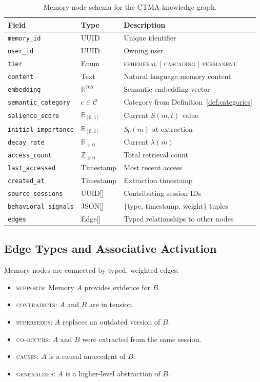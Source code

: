 \documentclass[11pt,a4paper]{article}
\begin{document}
\begin{table}[H]
\centering
\caption{Memory node schema for the CTMA knowledge graph.}
\label{tab:schema}
\small
\begin{tabularx}{\textwidth}{llX}
\toprule
\textbf{Field} & \textbf{Type} & \textbf{Description} \\
\midrule
\texttt{memory\_id} & UUID & Unique identifier \\
\texttt{user\_id} & UUID & Owning user \\
\texttt{tier} & Enum & \textsc{ephemeral} $|$ \textsc{cascading} $|$ \textsc{permanent} \\
\texttt{content} & Text & Natural language memory content \\
\texttt{embedding} & $\mathbb{R}^{768}$ & Semantic embedding vector \\
\texttt{semantic\_category} & $c \in \mathcal{C}$ & Category from Definition~\ref{def:categories} \\
\texttt{salience\_score} & $\mathbb{R}_{[0,1]}$ & Current $S(m, t)$ value \\
\texttt{initial\_importance} & $\mathbb{R}_{[0,1]}$ & $S_0(m)$ at extraction \\
\texttt{decay\_rate} & $\mathbb{R}_{>0}$ & Current $\lambda(m)$ \\
\texttt{access\_count} & $\mathbb{Z}_{\geq 0}$ & Total retrieval count \\
\texttt{last\_accessed} & Timestamp & Most recent access \\
\texttt{created\_at} & Timestamp & Extraction timestamp \\
\texttt{source\_sessions} & UUID[] & Contributing session IDs \\
\texttt{behavioral\_signals} & JSON[] & $\{$type, timestamp, weight$\}$ tuples \\
\texttt{edges} & Edge[] & Typed relationships to other nodes \\
\bottomrule
\end{tabularx}
\end{table}

\subsection{Edge Types and Associative Activation}

Memory nodes are connected by typed, weighted edges:

\begin{itemize}[leftmargin=2em]
  \item \textsc{supports}: Memory $A$ provides evidence for $B$.
  \item \textsc{contradicts}: $A$ and $B$ are in tension.
  \item \textsc{supersedes}: $A$ replaces an outdated version of $B$.
  \item \textsc{co-occurs}: $A$ and $B$ were extracted from the same session.
  \item \textsc{causes}: $A$ is a causal antecedent of $B$.
  \item \textsc{generalizes}: $A$ is a higher-level abstraction of $B$.
\end{itemize}
\end{document}
